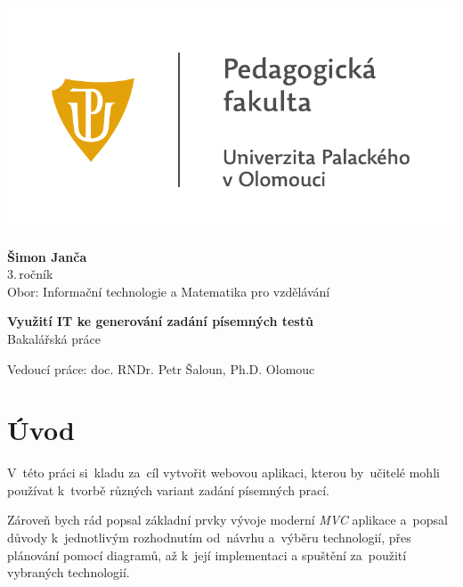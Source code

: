 \documentclass[14pt,a4paper]{article}
\begin{document}
	\begin{titlepage}
		\begin{center}
            {
            \centering
            \includegraphics[]{./PDF_tisk/UP_logo_PdF-UP_horizont_cz.pdf}
            }
			
			\vspace{3cm}

            {
                \LARGE
                \textbf{Šimon Janča}\\
                3.\,ročník\\[8mm]
                Obor: Informační technologie a Matematika pro vzdělávání
            }

            \vspace{4cm}
			
			{
			    \textbf{\Huge Využití IT ke generování zadání písemných testů}\\[4mm]
			    \Large
			    Bakalářská práce
			}

            \vfill
            
            {
                Vedoucí práce:
                doc. RNDr. Petr Šaloun, Ph.D.
                \hfill
    			Olomouc \the\year{}
            }
			
		\end{center}
	\end{titlepage}
	\tableofcontents
	
	\newpage
	
	\section{Úvod}
    V~této práci si~kladu za~cíl vytvořit webovou aplikaci, kterou by~učitelé mohli používat k~tvorbě různých variant zadání písemných prací.
    
    Zároveň bych rád popsal základní prvky vývoje moderní \emph{MVC} aplikace a~popsal důvody k~jednotlivým rozhodnutím od~návrhu
    a~výběru technologií, přes plánování pomocí diagramů, až k~její implementaci a spuštění za~použití vybraných technologií.
    
\end{document}
